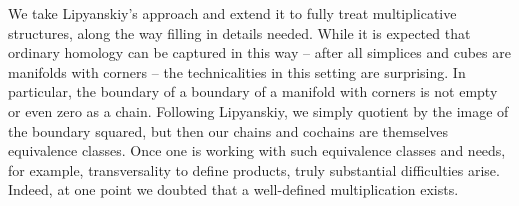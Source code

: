 We take Lipyanskiy's approach and extend it to fully treat multiplicative structures, along the way filling in details needed.
While it is expected that ordinary homology can be captured in this way -- after all simplices and cubes are manifolds with corners -- the technicalities in this setting are surprising.
In particular, the boundary of a boundary of a manifold with corners is not empty or even zero as a chain.
Following Lipyanskiy, we simply quotient by the image of the boundary squared, but then our chains and cochains are themselves equivalence classes.
Once one is working with such equivalence classes and needs, for example, transversality to define products, truly substantial difficulties arise.
Indeed, at one point we doubted that a well-defined multiplication exists.


